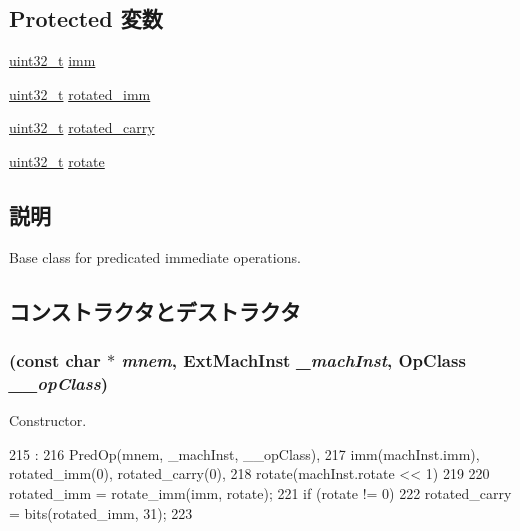 \subsection*{Protected 変数}
\begin{DoxyCompactItemize}
\item 
\hyperlink{Type_8hh_a435d1572bf3f880d55459d9805097f62}{uint32\_\-t} \hyperlink{classArmISA_1_1PredImmOp_a3aa9e175bd81b38df0e566643d5d4f8d}{imm}
\item 
\hyperlink{Type_8hh_a435d1572bf3f880d55459d9805097f62}{uint32\_\-t} \hyperlink{classArmISA_1_1PredImmOp_ab080bf5a74e561a7c7d966a6955099cb}{rotated\_\-imm}
\item 
\hyperlink{Type_8hh_a435d1572bf3f880d55459d9805097f62}{uint32\_\-t} \hyperlink{classArmISA_1_1PredImmOp_a750d768d83e77cd1bb934dd34c4e9b4e}{rotated\_\-carry}
\item 
\hyperlink{Type_8hh_a435d1572bf3f880d55459d9805097f62}{uint32\_\-t} \hyperlink{classArmISA_1_1PredImmOp_a64eafd8225233b1a693e0e79c9451c36}{rotate}
\end{DoxyCompactItemize}


\subsection{説明}
Base class for predicated immediate operations. 

\subsection{コンストラクタとデストラクタ}
\hypertarget{classArmISA_1_1PredImmOp_af3f7b8ce652d04ba2d7b5742d3442a12}{
\subsubsection[{PredImmOp}]{ (const char $\ast$ {\em mnem}, \/  {\bf ExtMachInst} {\em \_\-machInst}, \/  OpClass {\em \_\-\_\-opClass})}}
\label{classArmISA_1_1PredImmOp_af3f7b8ce652d04ba2d7b5742d3442a12}


Constructor. 


\begin{DoxyCode}
215                                                                           :
216               PredOp(mnem, _machInst, __opClass),
217               imm(machInst.imm), rotated_imm(0), rotated_carry(0),
218               rotate(machInst.rotate << 1)
219     {
220         rotated_imm = rotate_imm(imm, rotate);
221         if (rotate != 0)
222             rotated_carry = bits(rotated_imm, 31);
223     }

\end{DoxyCode}


